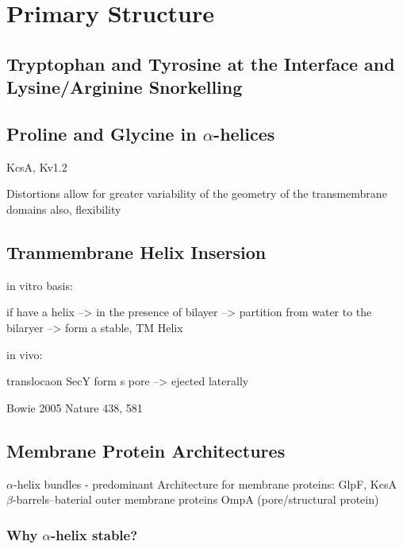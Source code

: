 \documentclass[
]{article}
\begin{document}
\hypertarget{primary-structure}{%
\section{Primary Structure}\label{primary-structure}}

\hypertarget{snorkel}{%
\subsection{Tryptophan and Tyrosine at the Interface and Lysine/Arginine Snorkelling}\label{snorkel}}

\hypertarget{proline-and-glycine-in-alpha-helices}{%
\subsection{\texorpdfstring{Proline and Glycine in \(\alpha\)-helices}{Proline and Glycine in \textbackslash alpha-helices}}\label{proline-and-glycine-in-alpha-helices}}

KcsA, Kv1.2

Distortions allow for greater variability of the geometry of the transmembrane domains
also, flexibility

\hypertarget{tranmembrane-helix-insersion}{%
\subsection{Tranmembrane Helix Insersion}\label{tranmembrane-helix-insersion}}

in vitro basis:

if have a helix --\textgreater{} in the presence of bilayer --\textgreater{} partition from water to the bilaryer --\textgreater{} form a stable, TM Helix

in vivo:

translocaon SecY form s pore --\textgreater{} ejected laterally

Bowie 2005 Nature 438, 581

\hypertarget{membrane-protein-architectures}{%
\subsection{Membrane Protein Architectures}\label{membrane-protein-architectures}}

\(\alpha\)-helix bundles - predominant Architecture for membrane proteins: GlpF, KcsA
\(\beta\)-barrels--baterial outer membrane proteins OmpA (pore/structural protein)

\hypertarget{why-alpha-helix-stable}{%
\subsubsection{\texorpdfstring{Why \(\alpha\)-helix stable?}{Why \textbackslash alpha-helix stable?}}\label{why-alpha-helix-stable}}
\end{document}
